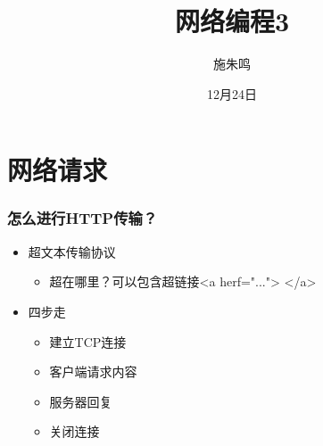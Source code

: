 \documentclass[12pt,AutoFakeBold,aspectratio=43,mathserif]{beamer}
\title{网络编程3}
\author{施朱鸣}
\date{12月24日}
\begin{document}
    {
    
    \begin{frame}
    \titlepage
    \end{frame}

    \section{网络请求}
    \begin{frame}
        \frametitle{怎么进行HTTP传输？}
    
        \begin{itemize}
            \item 超文本传输协议\begin{itemize}
                \item 超在哪里？可以包含超链接<a herf="..."> </a>
            \end{itemize}
            \item 四步走\begin{itemize}
                \item 建立TCP连接
                \item 客户端请求内容
                \item 服务器回复
                \item 关闭连接
            \end{itemize}
        \end{itemize}


\end{frame}}
\end{document}

